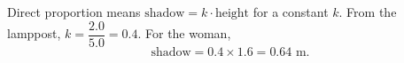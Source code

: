 Direct proportion means $\text{shadow}=k\cdot\text{height}$ for a constant $k$. From the lamppost, $k=\dfrac{2.0}{5.0}=0.4$. For the woman,
\[
\text{shadow}=0.4\times1.6=\boxed{0.64\text{ m}}.
\]

